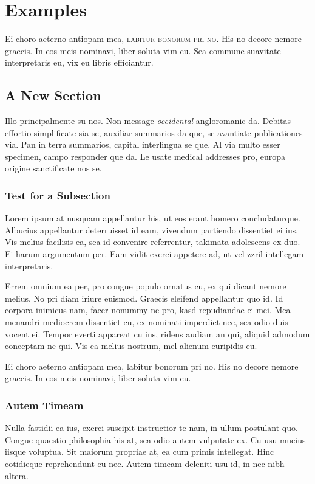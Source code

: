 \chapter{Examples}\label{ch:examples}
Ei choro aeterno antiopam mea, {\scshape labitur bonorum pri no}. His no decore
nemore graecis. In eos meis nominavi, liber soluta vim cu. Sea commune
suavitate interpretaris eu, vix eu libris efficiantur.
\section{A New Section}

Illo principalmente su nos. Non message \emph{occidental} angloromanic
da. Debitas effortio simplificate sia se, auxiliar summarios da que,
se avantiate publicationes via. Pan in terra summarios, capital
interlingua se que. Al via multo esser specimen, campo responder que
da. Le usate medical addresses pro, europa origine sanctificate nos
se.

\subsection{Test for a Subsection}
Lorem ipsum at nusquam appellantur his, ut eos erant homero
concludaturque. Albucius appellantur deterruisset id eam, vivendum
partiendo dissentiet ei ius. Vis melius facilisis ea, sea id convenire
referrentur, takimata adolescens ex duo. Ei harum argumentum per. Eam
vidit exerci appetere ad, ut vel zzril intellegam interpretaris.

Errem omnium ea per, pro congue populo ornatus cu, ex qui
dicant nemore melius. No pri diam iriure euismod. Graecis eleifend
appellantur quo id. Id corpora inimicus nam, facer nonummy ne pro,
kasd repudiandae ei mei. Mea menandri mediocrem dissentiet cu, ex
nominati imperdiet nec, sea odio duis vocent ei. Tempor everti
appareat cu ius, ridens audiam an qui, aliquid admodum conceptam ne
qui. Vis ea melius nostrum, mel alienum euripidis eu.

Ei choro aeterno antiopam mea, labitur bonorum pri no. His no decore
nemore graecis. In eos meis nominavi, liber soluta vim cu.

\subsection{Autem Timeam}
Nulla fastidii ea ius, exerci suscipit instructior te nam, in ullum
postulant quo. Congue quaestio philosophia his at, sea odio autem
vulputate ex. Cu usu mucius iisque voluptua. Sit maiorum propriae at,
ea cum  primis intellegat. Hinc cotidieque reprehendunt eu
nec. Autem timeam deleniti usu id, in nec nibh altera.

